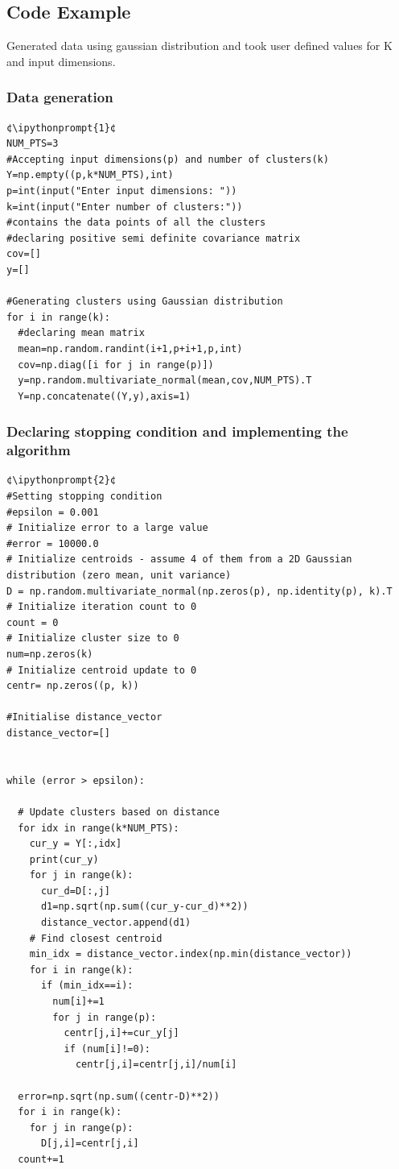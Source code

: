 \documentclass[12pt,letterpaper, onecolumn]{exam}
\newcommand*{\ipythonprompt}[1]{\makebox[0pt][r]{\textbf{In [#1]:}\hspace{1em}}}
\begin{document}
\subsection*{Code Example}
Generated data using gaussian distribution and took user defined values for K and input dimensions.

\subsubsection*{Data generation}
\begin{lstlisting}
¢\ipythonprompt{1}¢ 
NUM_PTS=3
#Accepting input dimensions(p) and number of clusters(k)
Y=np.empty((p,k*NUM_PTS),int)
p=int(input("Enter input dimensions: "))
k=int(input("Enter number of clusters:"))
#contains the data points of all the clusters
#declaring positive semi definite covariance matrix
cov=[]
y=[]

#Generating clusters using Gaussian distribution
for i in range(k):
  #declaring mean matrix
  mean=np.random.randint(i+1,p+i+1,p,int)
  cov=np.diag([i for j in range(p)])
  y=np.random.multivariate_normal(mean,cov,NUM_PTS).T
  Y=np.concatenate((Y,y),axis=1)
\end{lstlisting} 

\subsubsection*{Declaring stopping condition and implementing the algorithm}

\begin{lstlisting} 
¢\ipythonprompt{2}¢   
#Setting stopping condition
#epsilon = 0.001
# Initialize error to a large value
#error = 10000.0
# Initialize centroids - assume 4 of them from a 2D Gaussian distribution (zero mean, unit variance)
D = np.random.multivariate_normal(np.zeros(p), np.identity(p), k).T 
# Initialize iteration count to 0
count = 0
# Initialize cluster size to 0
num=np.zeros(k)
# Initialize centroid update to 0
centr= np.zeros((p, k))

#Initialise distance_vector
distance_vector=[]


while (error > epsilon):
  
  # Update clusters based on distance
  for idx in range(k*NUM_PTS):
    cur_y = Y[:,idx]
    print(cur_y)
    for j in range(k):
      cur_d=D[:,j]
      d1=np.sqrt(np.sum((cur_y-cur_d)**2))
      distance_vector.append(d1)
    # Find closest centroid 
    min_idx = distance_vector.index(np.min(distance_vector))
    for i in range(k):
      if (min_idx==i):
        num[i]+=1
        for j in range(p):
          centr[j,i]+=cur_y[j]
          if (num[i]!=0):
            centr[j,i]=centr[j,i]/num[i]
  
  error=np.sqrt(np.sum((centr-D)**2))
  for i in range(k):
    for j in range(p):
      D[j,i]=centr[j,i] 
  count+=1 
\end{lstlisting}
\end{document}
